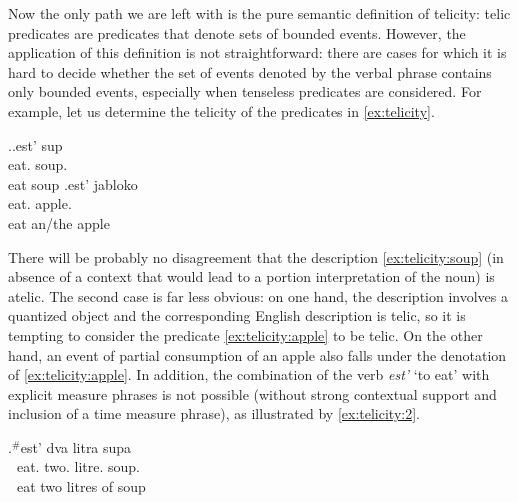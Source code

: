 


Now the only path we are left with is the pure semantic definition of telicity: telic predicates are predicates that denote sets of bounded events. However, the application of this definition is not straightforward: there are cases for which it is hard to decide whether the set of events denoted by the verbal phrase contains only bounded events, especially when tenseless predicates are considered. For example, let us determine the telicity of the predicates in \ref{ex:telicity}.

\ex.\label{ex:telicity}\ag.\label{ex:telicity:soup}est' sup\\
eat. soup.\\
eat soup
\bg.\label{ex:telicity:apple}est' jabloko\\
eat. apple.\\
eat an/the apple

There will be probably no disagreement that the description \ref{ex:telicity:soup} (in absence of a context that would lead to a portion interpretation of the noun) is atelic. The second case is far less obvious: on one hand, the description involves a quantized object and the corresponding English description is telic, so it is tempting to consider the predicate \ref{ex:telicity:apple} to be telic. On the other hand, an event of partial consumption of an apple also falls under the denotation of \ref{ex:telicity:apple}. In addition, the combination of the verb \textit{est'} `to eat' with explicit measure phrases is not possible (without strong contextual support and inclusion of a time measure phrase), as illustrated by \ref{ex:telicity:2}. 

\ex.$^\#$est' dva litra supa \label{ex:telicity:2}\\
\textcolor{white}{$^\#$}eat. two. litre. soup.\\
\textcolor{white}{$^\#$}eat two litres of soup

